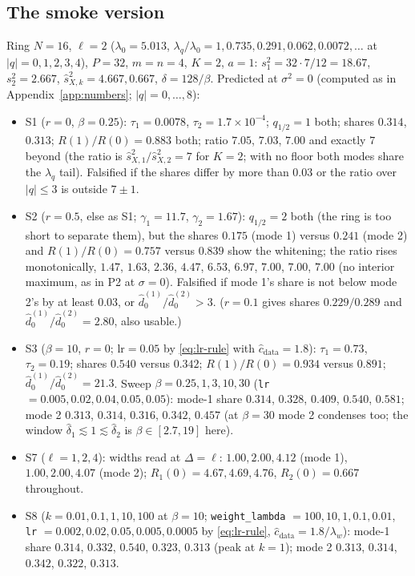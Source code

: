 \documentclass[11pt,a4paper]{article}
\newcommand{\code}[1]{\texttt{#1}}
\begin{document}
\subsection{The smoke version}
\label{sec:smoke}
Ring $N = 16$, $\ell = 2$ ($\lambda_0 = 5.013$, $\lambda_q/\lambda_0 = 1, 0.735, 0.291, 0.062, 0.0072, \dots$ at $|q| = 0,1,2,3,4$), $P = 32$, $m = n = 4$, $K = 2$, $a = 1$: $s_1^2 = 32\cdot7/12 = 18.67$, $s_2^2 = 2.667$, $\hat s_{X,k}^2 = 4.667, 0.667$, $\delta = 128/\beta$. Predicted at $\sigma^2 = 0$ (computed as in Appendix~\ref{app:numbers}; $|q| = 0,\dots,8$):
\begin{itemize}[nosep]
  \item S1 ($r = 0$, $\beta = 0.25$): $\tau_1 = 0.0078$, $\tau_2 = 1.7\times10^{-4}$; $q_{1/2} = 1$ both; shares $0.314$, $0.313$; $R(1)/R(0) = 0.883$ both; ratio $7.05$, $7.03$, $7.00$ and exactly $7$ beyond (the ratio is $\hat s_{X,1}^2/\hat s_{X,2}^2 = 7$ for $K = 2$; with no floor both modes share the $\lambda_q$ tail). Falsified if the shares differ by more than $0.03$ or the ratio over $|q|\le3$ is outside $7\pm1$.
  \item S2 ($r = 0.5$, else as S1; $\gamma_1 = 11.7$, $\gamma_2 = 1.67$): $q_{1/2} = 2$ both (the ring is too short to separate them), but the shares $0.175$ (mode 1) versus $0.241$ (mode 2) and $R(1)/R(0) = 0.757$ versus $0.839$ show the whitening; the ratio rises monotonically, $1.47$, $1.63$, $2.36$, $4.47$, $6.53$, $6.97$, $7.00$, $7.00$, $7.00$ (no interior maximum, as in P2 at $\sigma = 0$). Falsified if mode 1's share is not below mode 2's by at least $0.03$, or $\hat d_0^{(1)}/\hat d_0^{(2)} > 3$. ($r = 0.1$ gives shares $0.229/0.289$ and $\hat d_0^{(1)}/\hat d_0^{(2)} = 2.80$, also usable.)
  \item S3 ($\beta = 10$, $r = 0$; $\mathrm{lr} = 0.05$ by \eqref{eq:lr-rule} with $\hat c_{\mathrm{data}} = 1.8$): $\tau_1 = 0.73$, $\tau_2 = 0.19$; shares $0.540$ versus $0.342$; $R(1)/R(0) = 0.934$ versus $0.891$; $\hat d_0^{(1)}/\hat d_0^{(2)} = 21.3$. Sweep $\beta = 0.25, 1, 3, 10, 30$ (\code{lr} $= 0.005, 0.02, 0.04, 0.05, 0.05$): mode-1 share $0.314$, $0.328$, $0.409$, $0.540$, $0.581$; mode 2 $0.313$, $0.314$, $0.316$, $0.342$, $0.457$ (at $\beta = 30$ mode 2 condenses too; the window $\hat\delta_1\lesssim1\lesssim\hat\delta_2$ is $\beta\in[2.7, 19]$ here).
  \item S7 ($\ell = 1, 2, 4$): widths read at $\Delta = \ell$: $1.00, 2.00, 4.12$ (mode 1), $1.00, 2.00, 4.07$ (mode 2); $R_1(0) = 4.67, 4.69, 4.76$, $R_2(0) = 0.667$ throughout.
  \item S8 ($k = 0.01, 0.1, 1, 10, 100$ at $\beta = 10$; \code{weight\_lambda} $= 100, 10, 1, 0.1, 0.01$, \code{lr} $= 0.002, 0.02, 0.05, 0.005, 0.0005$ by \eqref{eq:lr-rule}, $\hat c_{\mathrm{data}} = 1.8/\lambda_w$): mode-1 share $0.314$, $0.332$, $0.540$, $0.323$, $0.313$ (peak at $k = 1$); mode 2 $0.313$, $0.314$, $0.342$, $0.322$, $0.313$.
\end{itemize}
\end{document}
